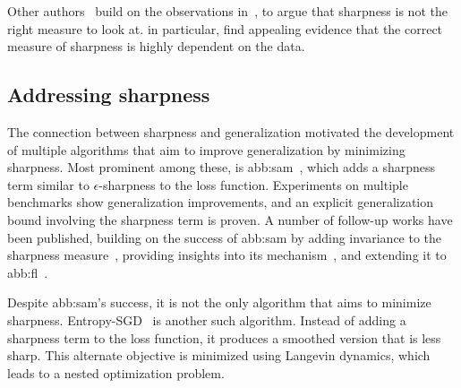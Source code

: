 Other authors~\cite{zhangWhyFlatnessDoes2021,andriushchenkoModernLookRelationship2023}
build on the observations in~\citet{dinhSharpMinimaCan2017},
to argue that sharpness is not the right measure to look at.
\citet{andriushchenkoModernLookRelationship2023} in particular,
find appealing evidence that the correct measure of sharpness is highly dependent on the data.

\subsection{Addressing sharpness}\label{sub:sharpness:addressing}

The connection between sharpness and generalization motivated the development of
multiple algorithms that aim to improve generalization by minimizing sharpness.
Most prominent among these, is \gls{abb:sam}~\cite{foretSharpnessawareMinimizationEfficiently2020},
which adds a sharpness term similar to \(\epsilon\)-sharpness to the loss function.
Experiments on multiple benchmarks show generalization improvements,
and an explicit generalization bound involving the sharpness term is proven.
A number of follow-up works have been published, building on the success of \gls{abb:sam}
by adding invariance to the sharpness measure~\cite{%
	kwonASAMAdaptiveSharpnessAware2021,%
	ibayashiMinimumSharpnessScaleinvariant2021%
},
providing insights into its mechanism~\cite{%
	tahmasebiUniversalClassSharpnessAware2024,%
	andriushchenkoUnderstandingSharpnessAwareMinimization2022%
},
and extending it to \gls{abb:fl}~\cite{caldarolaImprovingGeneralizationFederated2022}.

Despite \gls{abb:sam}'s success, it is not the only algorithm that aims to minimize sharpness.
Entropy-SGD~\cite{chaudhariEntropySGDBiasingGradient2019} is another such algorithm.
Instead of adding a sharpness term to the loss function,
it produces a smoothed version that is less sharp.
This alternate objective is minimized using Langevin dynamics,
which leads to a nested optimization problem.

